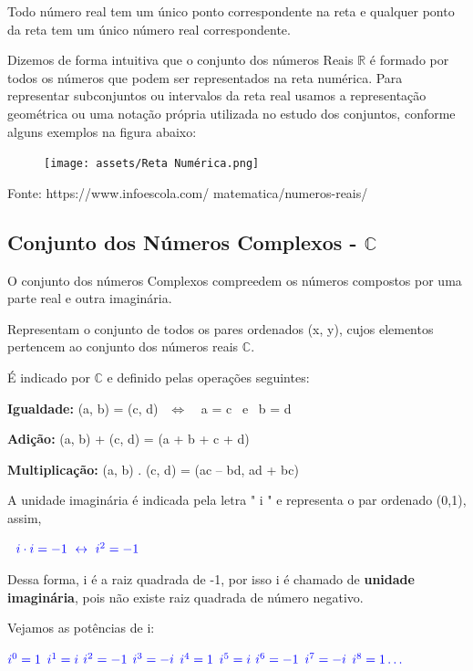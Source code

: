 \begin{multicols*}{2}
	Todo número real tem um único ponto correspondente na reta e qualquer ponto da reta tem um único número real correspondente.

	Dizemos de forma intuitiva que o conjunto dos números Reais $\mathbb{R}$ é formado por todos os números que podem ser representados na reta numérica. Para representar subconjuntos ou intervalos da reta real usamos a representação geométrica ou uma notação própria utilizada no estudo dos conjuntos, conforme alguns exemplos na figura abaixo:

	\begin{figure}[H]
		\centering
		\texttt{[image: assets/Reta Numérica.png]}
	\end{figure}



	Fonte: 	https://www.infoescola.com/
	matematica/numeros-reais/\\

	\subsection{Conjunto dos Números Complexos - $\mathbb{C}$}

	O conjunto dos números Complexos compreedem os números compostos por uma parte real e outra imaginária.

	Representam o conjunto de todos os pares ordenados (x, y), cujos elementos pertencem ao conjunto dos números reais $\mathbb{C}$.

	É indicado por $\mathbb{C}$ e definido pelas operações seguintes:

	\textbf{Igualdade:} (a, b) = (c, d) $ \ \ \Longleftrightarrow \ $ \ a = c \ e \ b = d

	\textbf{Adição:} (a, b) + (c, d) = (a + b + c + d)

	\textbf{Multiplicação:} (a, b) . (c, d) = (ac – bd, ad + bc)

	A unidade imaginária é indicada pela letra " i " e representa o par ordenado (0,1), assim,

	$\color{blue} \ \ i \cdot i = -1 \ \leftrightarrow \ i^2 = -1$

	Dessa forma, i é a raiz quadrada de -1, por isso i é chamado de \textbf{unidade imaginária}, pois não existe raiz quadrada de número negativo.

	Vejamos as potências de i:

	$\color{blue} i^0 = 1$
	$\color{blue} i^1 = i $
	$\color{blue} i^2 = -1$
	$\color{blue} i^3 = -i $
	$\color{blue} i^4 = 1$
	$\color{blue} i^5 = i$
	$\color{blue} i^6 = -1$
	$\color{blue} i^7 = -i$
	$\color{blue} i^8 = 1 \dots$


\end{multicols*}
